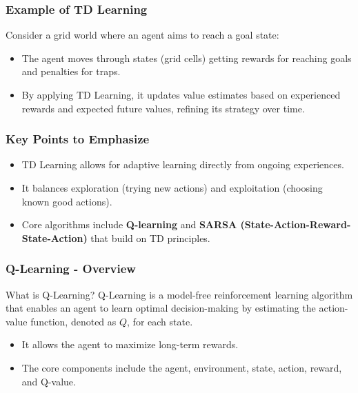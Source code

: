 \documentclass[aspectratio=169]{beamer}
\begin{document}
\begin{frame}[fragile]
    \frametitle{Example of TD Learning}
    Consider a grid world where an agent aims to reach a goal state:
    \begin{itemize}
        \item The agent moves through states (grid cells) getting rewards for reaching goals and penalties for traps.
        \item By applying TD Learning, it updates value estimates based on experienced rewards and expected future values, refining its strategy over time.
    \end{itemize}
\end{frame}

\begin{frame}[fragile]
    \frametitle{Key Points to Emphasize}
    \begin{itemize}
        \item TD Learning allows for adaptive learning directly from ongoing experiences.
        \item It balances exploration (trying new actions) and exploitation (choosing known good actions).
        \item Core algorithms include \textbf{Q-learning} and \textbf{SARSA (State-Action-Reward-State-Action)} that build on TD principles.
    \end{itemize}
\end{frame}

\begin{frame}[fragile]
    \frametitle{Q-Learning - Overview}
    \begin{block}{What is Q-Learning?}
        Q-Learning is a model-free reinforcement learning algorithm that enables an agent to learn optimal decision-making by estimating the action-value function, denoted as \( Q \), for each state.
    \end{block}
    \begin{itemize}
        \item It allows the agent to maximize long-term rewards.
        \item The core components include the agent, environment, state, action, reward, and Q-value.
    \end{itemize}
\end{frame}
\end{document}
